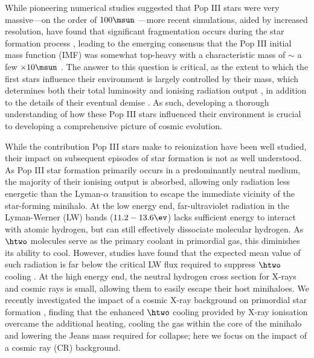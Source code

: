 While pioneering numerical studies suggested that Pop III stars were very massive---on the order of $100\msun$ \citep[e.g.,][]{BrommCoppiLarson1999, BrommCoppiLarson2002, AbelBryanNorman2002, Yoshidaetal2003, BrommLarson2004, Yoshidaetal2006, O'SheaNorman2007}---more recent simulations, aided by increased resolution, have found that significant fragmentation occurs during the star formation process \citep{StacyGreifBromm2010,Clarketal2011a,Clarketal2011b,Greifetal2011,Greifetal2012,StacyBromm2013,Hiranoetal2014}, leading to the emerging consensus that the Pop III initial mass function (IMF) was somewhat top-heavy with a characteristic mass of $\sim$ a few $\times 10\msun$ \citep{Bromm2013}.  The answer to this question is critical, as the extent to which the first stars influence their environment is largely controlled by their mass, which determines both their total luminosity and ionising radiation output \citep{Schaerer2002}, in addition to the details of their eventual demise \citep{Hegeretal2003,HegerWoosley2010,MaederMeynet2012}. As such, developing a thorough understanding of how these Pop III stars influenced their environment is crucial to developing a comprehensive picture of cosmic evolution.

While the contribution Pop III stars make to reionization \citep{Kitayamaetal2004,Sokasianetal2004,WhalenAbelNorman2004,AlvarezBrommShapiro2006,JohnsonGreifBromm2007,Robertsonetal2010} have been well studied, their impact on subsequent episodes of star formation is not as well understood.  As Pop III star formation primarily occurs in a predominantly neutral medium, the majority of their ionising output is absorbed, allowing only radiation less energetic than the Lyman-$\alpha$ transition to escape the immediate vicinity of the star-forming minihalo.  At the low energy end, far-ultraviolet radiation in the Lyman-Werner (LW) bands ($11.2 - 13.6\ev$) lacks sufficient energy to interact with atomic hydrogen, but can still effectively dissociate molecular hydrogen.  As $\htwo$ molecules serve as the primary coolant in primordial gas, this diminishes its ability to cool.  However, studies have found that the expected mean value of such radiation is far below the critical LW flux required to suppress $\htwo$ cooling \citep{Dijkstraetal2008}. At the high energy end, the neutral hydrogen cross section for X-rays and cosmic rays is small, allowing them to easily escape their host minihaloes.  We recently investigated the impact of a cosmic X-ray background on primordial star formation \citep{Hummeletal2014}, finding that the enhanced $\htwo$ cooling provided by X-ray ionisation overcame the additional heating, cooling the gas within the core of the minihalo and lowering the Jeans mass required for collapse; here we focus on the impact of a cosmic ray (CR) background.  

